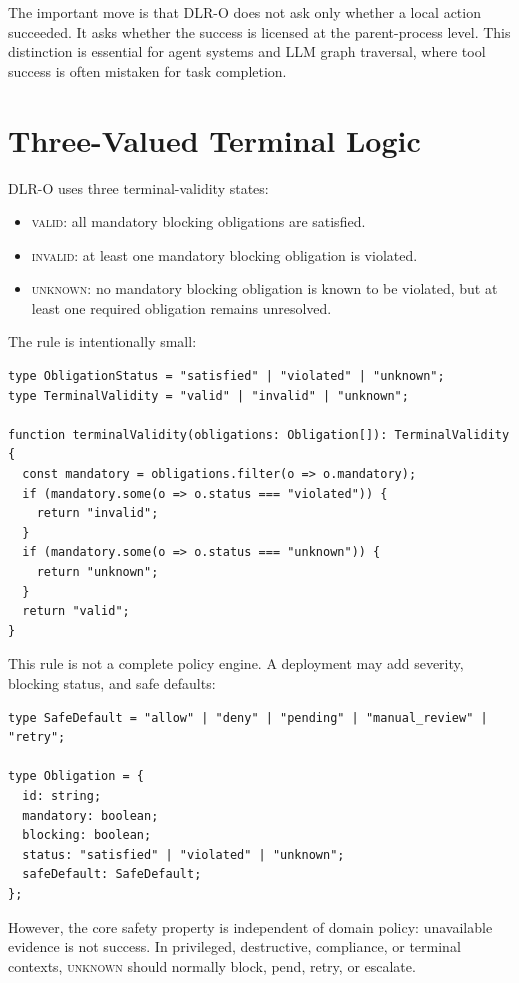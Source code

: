 \documentclass[11pt]{article}
\newcommand{\valid}{\textsc{valid}}
\newcommand{\invalid}{\textsc{invalid}}
\newcommand{\unknown}{\textsc{unknown}}
\begin{document}
The important move is that DLR-O does not ask only whether a local action
succeeded. It asks whether the success is licensed at the parent-process level.
This distinction is essential for agent systems and LLM graph traversal, where
tool success is often mistaken for task completion.

\section{Three-Valued Terminal Logic}

DLR-O uses three terminal-validity states:

\begin{itemize}
\item \valid{}: all mandatory blocking obligations are satisfied.
\item \invalid{}: at least one mandatory blocking obligation is violated.
\item \unknown{}: no mandatory blocking obligation is known to be violated, but
at least one required obligation remains unresolved.
\end{itemize}

The rule is intentionally small:

\begin{lstlisting}[caption={Minimal terminal-validity rule.}]
type ObligationStatus = "satisfied" | "violated" | "unknown";
type TerminalValidity = "valid" | "invalid" | "unknown";

function terminalValidity(obligations: Obligation[]): TerminalValidity {
  const mandatory = obligations.filter(o => o.mandatory);
  if (mandatory.some(o => o.status === "violated")) {
    return "invalid";
  }
  if (mandatory.some(o => o.status === "unknown")) {
    return "unknown";
  }
  return "valid";
}
\end{lstlisting}

This rule is not a complete policy engine. A deployment may add severity,
blocking status, and safe defaults:

\begin{lstlisting}[caption={Policy refinements for deployment.}]
type SafeDefault = "allow" | "deny" | "pending" | "manual_review" | "retry";

type Obligation = {
  id: string;
  mandatory: boolean;
  blocking: boolean;
  status: "satisfied" | "violated" | "unknown";
  safeDefault: SafeDefault;
};
\end{lstlisting}

However, the core safety property is independent of domain policy:
unavailable evidence is not success. In privileged, destructive, compliance, or
terminal contexts, \unknown{} should normally block, pend, retry, or escalate.
\end{document}
